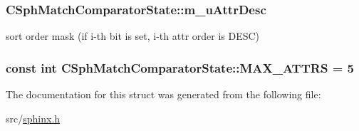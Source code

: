 \hypertarget{structCSphMatchComparatorState_a018723ab4c662b84dd54155a71a529b9}{
\subsubsection[{m\-\_\-u\-Attr\-Desc}]{ C\-Sph\-Match\-Comparator\-State\-::m\-\_\-u\-Attr\-Desc}}\label{structCSphMatchComparatorState_a018723ab4c662b84dd54155a71a529b9}


sort order mask (if i-\/th bit is set, i-\/th attr order is D\-E\-S\-C) 

\hypertarget{structCSphMatchComparatorState_a2537521712fc482d4d5a06cb24e27995}{
\subsubsection[{M\-A\-X\-\_\-\-A\-T\-T\-R\-S}]{\setlength{\rightskip}{0pt plus 5cm}const {\bf int} C\-Sph\-Match\-Comparator\-State\-::\-M\-A\-X\-\_\-\-A\-T\-T\-R\-S = 5\hspace{0.3cm}{\ttfamily [static]}}}\label{structCSphMatchComparatorState_a2537521712fc482d4d5a06cb24e27995}


The documentation for this struct was generated from the following file\-:\begin{DoxyCompactItemize}
\item 
src/\hyperlink{sphinx_8h}{sphinx.\-h}\end{DoxyCompactItemize}

